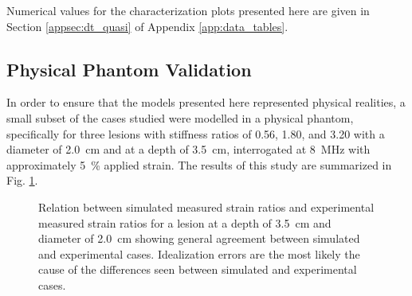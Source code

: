 			Numerical values for the characterization plots presented here are given in Section \ref{appsec:dt_quasi} of Appendix \ref{app:data_tables}.

		\subsection{Physical Phantom Validation}
			In order to ensure that the models presented here represented physical realities, a small subset of the cases studied were modelled in a physical phantom, specifically for three lesions with stiffness ratios of 0.56, 1.80, and 3.20 with a diameter of \SI{2.0}{\cm} and at a depth of \SI{3.5}{\cm}, interrogated at \SI{8}{\MHz} with approximately \SI{5}{\percent} applied strain. The results of this study are summarized in Fig. \ref{fig:phantom_validation}.

			\begin{figure}[!htb]
				\centering
				\caption[Experimental validation of quasi-static model results]{Relation between simulated measured strain ratios and experimental measured strain ratios for a lesion at a depth of \SI{3.5}{\cm} and diameter of \SI{2.0}{\cm} showing general agreement between simulated and experimental cases. Idealization errors are the most likely the cause of the differences seen between simulated and experimental cases.}
				\label{fig:phantom_validation}
			\end{figure}


